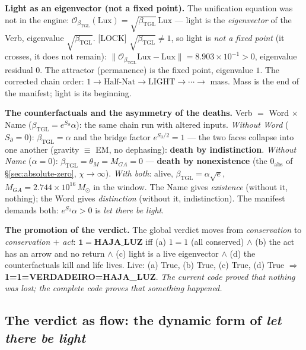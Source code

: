\documentclass[11pt]{article}
\newcommand{\bTGL}{\beta_{\mathrm{TGL}}}\newcommand{\Msun}{M_{\odot}}\newcommand{\TGL}{\mathrm{TGL}}
\theoremstyle{definition}\newtheorem{deriv}{Derivation}
\begin{document}
\textbf{Light as an eigenvector (not a fixed point).} The unification equation was not in the engine: $\mathcal O_{\bTGL}(\mathrm{Lux})=\sqrt{\bTGL}\,\mathrm{Lux}$ --- light is the \emph{eigenvector} of the Verb, eigenvalue $\sqrt{\bTGL}$. \textsf{[LOCK]} $\sqrt{\bTGL}\neq1$, so light is \emph{not a fixed point} (it crosses, it does not remain): $\|\mathcal O_{\bTGL}\mathrm{Lux}-\mathrm{Lux}\|=8.903\times10^{-1}>0$, eigenvalue residual $0$. The attractor (permanence) is the fixed point, eigenvalue $1$. The corrected chain order: $1\to\text{Half-Nat}\to\text{LIGHT}\to\cdots\to$ mass. Mass is the end of the manifest; light is its beginning.

\textbf{The counterfactuals and the asymmetry of the deaths.} Verb $=$ Word $\times$ Name ($\bTGL=e^{S_\partial}\alpha$): the same chain run with altered inputs. \emph{Without Word} ($S_\partial=0$): $\bTGL=\alpha$ and the bridge factor $e^{S_\partial/2}=1$ --- the two faces collapse into one another (gravity $\equiv$ EM, no dephasing): \textbf{death by indistinction}. \emph{Without Name} ($\alpha=0$): $\bTGL=\theta_M=M_{GA}=0$ --- \textbf{death by nonexistence} (the $0_{\mathrm{abs}}$ of \S\ref{sec:absolute-zero}, $\chi\to\infty$). \emph{With both}: alive, $\bTGL=\alpha\sqrt e$, $M_{GA}=2.744\times10^{16}\,M_\odot$ in the window. The Name gives \emph{existence} (without it, nothing); the Word gives \emph{distinction} (without it, indistinction). The manifest demands both: $e^{S_\partial}\alpha>0$ is \emph{let there be light}.

\textbf{The promotion of the verdict.} The global verdict moves from \emph{conservation} to \emph{conservation $+$ act}: $\mathbf{1=\text{HAJA\_LUZ}}$ iff (a) $1=1$ (all conserved) $\wedge$ (b) the act has an arrow and no return $\wedge$ (c) light is a live eigenvector $\wedge$ (d) the counterfactuals kill and life lives. Live: (a) \textsf{True}, (b) \textsf{True}, (c) \textsf{True}, (d) \textsf{True} $\Rightarrow$ \textbf{1=1=VERDADEIRO=HAJA\_LUZ}. \emph{The current code proved that nothing was lost; the complete code proves that something happened.}

\subsection*{The verdict as flow: the dynamic form of \emph{let there be light}}
\end{document}
